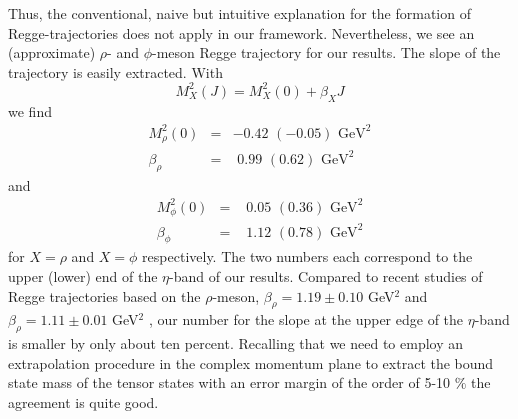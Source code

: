 Thus, the conventional, naive but intuitive explanation for the formation of Regge-trajectories does not apply
in our framework. Nevertheless, we see an (approximate) $\rho$- and $\phi$-meson Regge trajectory 
for our results. The slope of the trajectory is easily extracted. With
\begin{equation}
M^2_X(J) = M^2_X(0) + \beta_X J
\end{equation} 
we find
\begin{eqnarray}
M^2_\rho(0) &=& -0.42 \,\,(-0.05)\,\, \mbox{GeV}^2 \nonumber\\
\beta_\rho &=& \,\,0.99 \,\,(0.62)\,\, \mbox{GeV}^2 \nonumber
\end{eqnarray}
and 
\begin{eqnarray}
M^2_\phi(0) &=& \,\,0.05 \,\,(0.36)\,\, \mbox{GeV}^2 \nonumber\\
 \beta_\phi &=& \,\,1.12 \,\,(0.78)\,\, \mbox{GeV}^2 \nonumber
\end{eqnarray}
for $X=\rho$ and $X=\phi$ respectively. The two numbers each correspond to the upper (lower)
end of the $\eta$-band of our results. Compared to recent studies of Regge trajectories
based on the $\rho$-meson, $\beta_\rho = 1.19 \pm 0.10$ GeV$^2$ \cite{Masjuan:2012gc} and 
$\beta_\rho = 1.11 \pm 0.01$ GeV$^2$ \cite{Londergan:2013dza}, our number for the slope at the
upper edge of the $\eta$-band is smaller by only about 
ten percent. Recalling that we need to employ an extrapolation procedure in the complex 
momentum plane to extract the bound state mass of the tensor states with an error margin 
of the order of 5-10 $\%$ the agreement is quite good.

